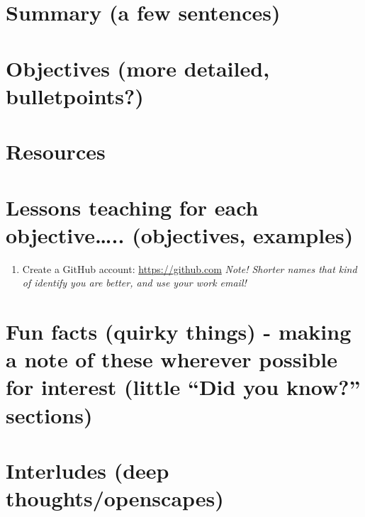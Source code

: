 \documentclass[]{book}
\providecommand{\tightlist}{%
  \setlength{\itemsep}{0pt}\setlength{\parskip}{0pt}}
\begin{document}
\hypertarget{summary-a-few-sentences-6}{%
\section{Summary (a few sentences)}\label{summary-a-few-sentences-6}}

\hypertarget{objectives-more-detailed-bulletpoints-6}{%
\section{Objectives (more detailed, bulletpoints?)}\label{objectives-more-detailed-bulletpoints-6}}

\hypertarget{resources-6}{%
\section{Resources}\label{resources-6}}

\hypertarget{lessons-teaching-for-each-objective..-objectives-examples-5}{%
\section{Lessons teaching for each objective\ldots{}.. (objectives, examples)}\label{lessons-teaching-for-each-objective..-objectives-examples-5}}

\begin{enumerate}
\def\labelenumi{\arabic{enumi}.}
\tightlist
\item
  Create a GitHub account: \url{https://github.com} \emph{Note! Shorter names that kind of identify you are better, and use your work email!}
\end{enumerate}

\hypertarget{fun-facts-quirky-things---making-a-note-of-these-wherever-possible-for-interest-little-did-you-know-sections-5}{%
\section{Fun facts (quirky things) - making a note of these wherever possible for interest (little ``Did you know?'' sections)}\label{fun-facts-quirky-things---making-a-note-of-these-wherever-possible-for-interest-little-did-you-know-sections-5}}

\hypertarget{interludes-deep-thoughtsopenscapes-6}{%
\section{Interludes (deep thoughts/openscapes)}\label{interludes-deep-thoughtsopenscapes-6}}
\end{document}
